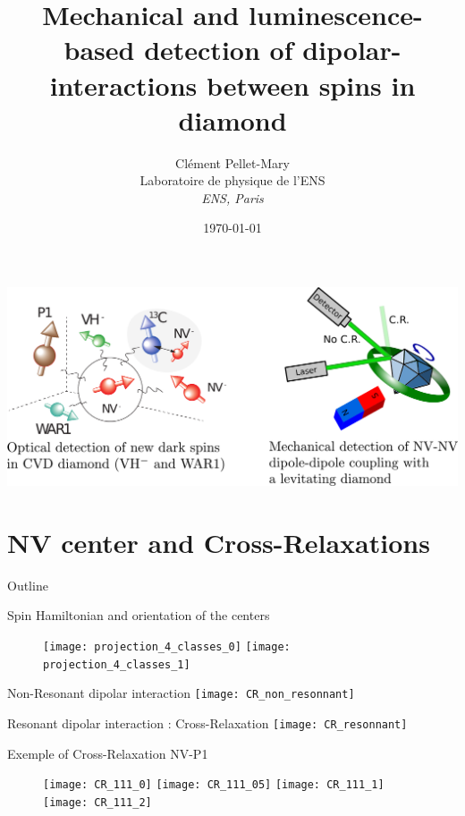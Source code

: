 \documentclass{beamer}
\title{Mechanical and luminescence-based detection of dipolar-interactions between spins in diamond}
\author{Clément Pellet-Mary\\ Laboratoire de physique de l'ENS\\ \textit{ENS, Paris}}
\date\today
\begin{document}
\begin{frame}
\maketitle
\end{frame}
\begin{frame}
\includegraphics[scale=.3]{Shémas_intro}
\end{frame}
\section{NV center and Cross-Relaxations}
\begin{frame}{Outline}
\tableofcontents[currentsection]
\end{frame}
\begin{frame}{Spin Hamiltonian and orientation of the centers}
\begin{figure}
    \begin{overprint}
    \centering\texttt{[image: projection\_4\_classes\_0]}
    \centering\texttt{[image: projection\_4\_classes\_1]}
    \end{overprint}
\end{figure}
\end{frame}
\begin{frame}{Non-Resonant dipolar interaction}
\centering
\texttt{[image: CR\_non\_resonnant]}
\end{frame}
\begin{frame}{Resonant dipolar interaction : Cross-Relaxation}
\centering
\texttt{[image: CR\_resonnant]}
\end{frame}
\begin{frame}{Exemple of Cross-Relaxation NV-P1}
\begin{figure}
    \begin{overprint}
    \texttt{[image: CR\_111\_0]}
    \texttt{[image: CR\_111\_05]}
    \texttt{[image: CR\_111\_1]}
    \texttt{[image: CR\_111\_2]}
    \end{overprint}
\end{figure}
\end{frame}
\end{document}
